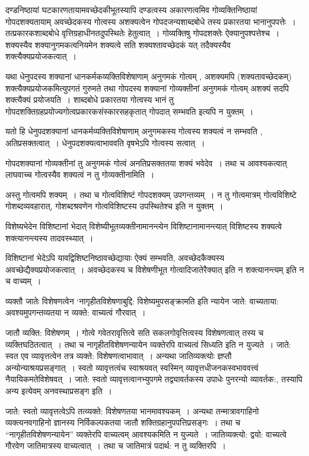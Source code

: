 {दण्डनिष्ठायां घटकारणतायामवच्छेदकीभूतस्यापि दण्डत्वस्य अकारणत्वमिव गोव्यक्ति\-निष्ठायां गोपदशक्यतायाम् अवच्छेदकस्य गोत्वस्य अशक्यत्वेन गोपदजन्यशाब्दबोधे तस्य प्रकारतया भानानुपपत्तेः~। तत्प्रकारकशाब्दबोधे वृत्तिग्रहाधीनतदुपस्थितेः हेतुत्वात्~। गोव्यक्तिषु गोपदशक्तेः ऐक्यानुपश्पत्तेश्च~। शक्यस्यैव शक्यानुगमकत्वनियमेन शक्यत्वे सति शक्यश्तावच्छेदकं यत् तदैक्यस्यैव शक्त्यैक्यप्रयोजकत्वात्~। 

यथा धेनुपदस्य शक्यानां धानकर्मकव्यक्तिविशेषाणाम् अनुगमकं गोत्वम् , अशक्यमपि (शक्यतावच्छेदकम्) शक्त्यैक्यप्रयोजकमित्युपगतं गुरुमते तथा गोपदस्य शक्यानां गोव्यक्तीनां अनुगमकं गोत्वम् अशक्यं सदपि शक्त्यैक्यं प्रयोजयति~। शाब्दबोधे प्रकारतया गोत्वस्य भानं तु गोपदशक्तिग्रहप्रयोज्यगोत्वप्रकारकसंस्कारसहकृतात् गोपदात् सम्भवति इत्यपि न युक्तम्~। 

यतो हि धेनुपदशक्यानां धानकर्मव्यक्तिविशेषाणाम् अनुगमकस्य गोत्वस्य शक्यत्वं न सम्भवति , अतिप्रसक्तत्वात्~। धेनुपदशक्यत्वाभाववति वृषभेऽपि गोत्वस्य सत्वात्~। 

गोपदशक्यानां गोव्यक्तीनां तु अनुगमकं गोत्वं अनतिप्रसक्ततया शक्यं भवेदेव~। तथा च आवश्यकत्वात् लाघवाच्च गोत्वस्यैव शक्यत्वं न तु गोव्यक्तीनामिति~। 

अस्तु गोत्वमपि शक्यम्~। तथा च गोत्वविशिष्टं गोपदशक्यम् उपगन्तव्यम्~। न तु गोत्वमात्रम् गोत्वविशिष्टे गोशब्दव्यवहारात्, गोशब्दश्रवणेन गोत्वविशिष्टस्य उपस्थितेश्च इति न युक्तम्~। 

विशेष्यभेदेन विशिष्टानां भेदात् विशेष्यीभूतव्यक्तीनामानन्त्येन विशिष्टानामानन्त्यात् विशिष्टस्य शक्यत्वे शक्त्यानन्त्यस्य तादवस्थ्यात्~। 

विशिष्टानां भेदेऽपि यावद्विशिष्टनिष्ठावच्छेद्यायाः ऐक्यं सम्भवति, अवच्छेदकैक्यस्य अवच्छेद्यैक्यप्रयोजकत्वात्~। अवच्छेदकस्य च विशेषणीभूत गोत्वादिजातेरैक्यात् इति न शक्त्यानन्त्यम् इति न च वाच्यम्~। 

व्यक्तौ जातेः विशेषणत्वेन ‘नागृहीतविशेषणाबुद्दि: विशेष्यमुपसङ्क्रामति इति न्यायेन जाते: वाच्यताया: अवश्यमुपगन्तव्यतया न व्यक्ते: वाच्यत्वं गौरवात्~। 

जातौ व्यक्ति: विशेषणम्~। गोत्वे गवेतरावृत्तित्वे सति सकलगोवृत्तित्वस्य विशेषणत्वात् तस्य च व्यक्तिघठितत्वात्~। तथा च नागृहीतविशेषणन्यायेन व्यक्तेरपि वाच्यत्वं सिध्यति इति न युज्यते~। जाते: स्वत एव व्यावृत्तत्वेन तत्र व्यक्ते: विशेषणत्वाभावात्~। अन्यथा जातिव्यक्त्योः ज्ञप्तौ अन्योन्याश्रयप्रसङ्गात्~। स्वतो व्यावृत्तत्वंच स्वाश्रयवत् स्वस्मिन् व्यावृत्तधीजनकस्वभाववत्त्वं नैयायिकमतेविशेषवत्~। जाते: स्वतो व्यावृत्तत्वानभ्युपगमे तद्व्यावर्तकस्य उपाधेः पुनरन्यो व्यावर्तक:, तस्यापि अन्य इत्येवम् अनवस्थाप्रसङ्ग इति~। 

जाते: स्वतो व्यावृत्तत्वेऽपि तत्व्यक्ते: विशेषणतया भानमावश्यकम्~। अन्यथा तन्मात्रावगाहिनो व्यक्त्यनवगाहिनो ज्ञानस्य निर्विकल्पकतया जातौ शक्तिग्रहानुपपत्तिप्रसङ्गः~। तथा च “नागृहीतविशेषणन्यायेन” व्यक्तेरपि वाच्यत्वम् आवश्यकमिति न युज्यते~। जातिव्यक्त्यो: द्वयो: वाच्यत्वे गौरवेण जातिमात्रस्य वाच्यत्वात्~। तथा च जातिमात्रं पदार्थ: न तु व्यक्तिरपि~। 

}
